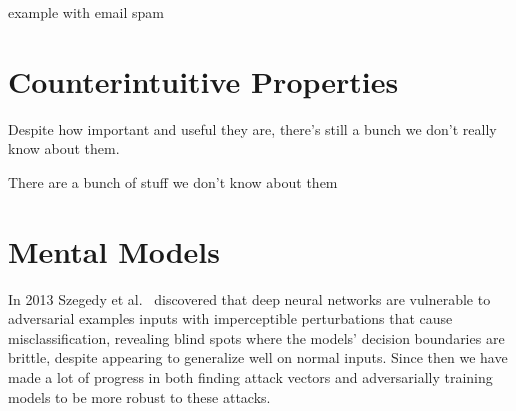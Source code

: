 \documentclass[a4paper, oneside]{discothesis}
\begin{document}

example with email spam



\section{Counterintuitive Properties}

Despite how important and useful they are, there's still a bunch we don't really know about them.

There are a bunch of stuff we don't know about them

\section{Mental Models}






In 2013 Szegedy et al.~\cite{cubuk2017intriguing} discovered that deep neural networks are vulnerable to adversarial examples \textendash{} inputs with imperceptible perturbations that cause misclassification, revealing blind spots where the models' decision boundaries are brittle, despite appearing to generalize well on normal inputs. Since then we have made a lot of progress in both finding attack vectors \cite{goodfellow2014explaining} \cite{madry2017towards} \cite{papernot2016limitations} and adversarially training models to be more robust \cite{shafahi2019adversarial} \cite{madry2017towards} \cite{papernot2016distillation} to these attacks.
\end{document}
